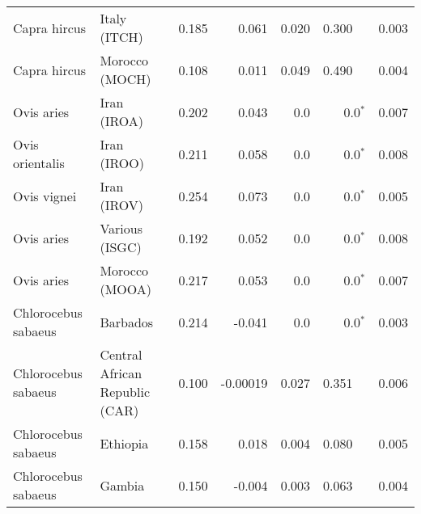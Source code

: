 \begin{center}
\begin{adjustbox}{width = 1\textwidth}
\begin{tabular}{|l|l|r|r|r|r|r|}
        Capra hircus &                    Italy (ITCH) &                 0.185 &                                0.061 &                0.020 &                                  0.300~~ &              0.003 \\
        Capra hircus &                  Morocco (MOCH) &                 0.108 &                                0.011 &                0.049 &                                  0.490~~ &              0.004 \\
          Ovis aries &                     Iran (IROA) &                 0.202 &                                0.043 &                  0.0 &                             0.0$\bm{^*}$ &              0.007 \\
     Ovis orientalis &                     Iran (IROO) &                 0.211 &                                0.058 &                  0.0 &                             0.0$\bm{^*}$ &              0.008 \\
         Ovis vignei &                     Iran (IROV) &                 0.254 &                                0.073 &                  0.0 &                             0.0$\bm{^*}$ &              0.005 \\
          Ovis aries &                  Various (ISGC) &                 0.192 &                                0.052 &                  0.0 &                             0.0$\bm{^*}$ &              0.008 \\
          Ovis aries &                  Morocco (MOOA) &                 0.217 &                                0.053 &                  0.0 &                             0.0$\bm{^*}$ &              0.007 \\
 Chlorocebus sabaeus &                        Barbados &                 0.214 &                               -0.041 &                  0.0 &                             0.0$\bm{^*}$ &              0.003 \\
 Chlorocebus sabaeus &  Central African Republic (CAR) &                 0.100 &                             -0.00019 &                0.027 &                                  0.351~~ &              0.006 \\
 Chlorocebus sabaeus &                        Ethiopia &                 0.158 &                                0.018 &                0.004 &                                  0.080~~ &              0.005 \\
 Chlorocebus sabaeus &                          Gambia &                 0.150 &                               -0.004 &                0.003 &                                  0.063~~ &              0.004 \\

\end{tabular}
\end{adjustbox}
\end{center}
